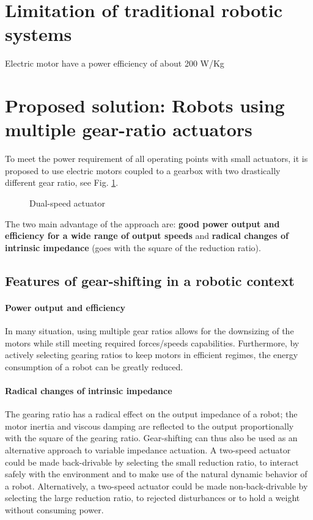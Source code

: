 \section{Limitation of traditional robotic systems}
\label{sec:limitationOfTraditionnalRoboticSystems}

Electric motor have a power efficiency of about 200 W/Kg


\section{Proposed solution: Robots using multiple gear-ratio actuators}
\label{sec:ProposedSolutionRobotsUsingMultipleGearRatioActuators}


To meet the power requirement of all operating points with small actuators, it is proposed to use electric motors coupled to a gearbox with two drastically different gear ratio, see Fig. \ref{fig:2s}. 

\begin{figure}[htb]
        \centering
        \caption{Dual-speed actuator}\label{fig:2s}
\end{figure}


The two main advantage of the approach are: \textbf{good power output and efficiency for a wide range of output speeds} and \textbf{radical changes of intrinsic impedance} (goes with the square of the reduction ratio). 

\subsection{Features of gear-shifting in a robotic context}

\paragraph{Power output and efficiency}
In many situation, using multiple gear ratios allows for the downsizing of the motors while still meeting required forces/speeds capabilities. Furthermore, by actively selecting gearing ratios to keep motors in efficient regimes, the energy consumption of a robot can be greatly reduced. 

\paragraph{Radical changes of intrinsic impedance}
The gearing ratio has a radical effect on the output impedance of a robot; the motor inertia and viscous damping are reflected to the output proportionally with the square of the gearing ratio. Gear-shifting can thus also be used as an alternative approach to variable impedance actuation. A two-speed actuator could be made back-drivable by selecting the small reduction ratio, to interact safely with the environment and to make use of the natural dynamic behavior of a robot.  Alternatively, a two-speed actuator could be made non-back-drivable by selecting the large reduction ratio, to rejected disturbances or to hold a weight without consuming power.


